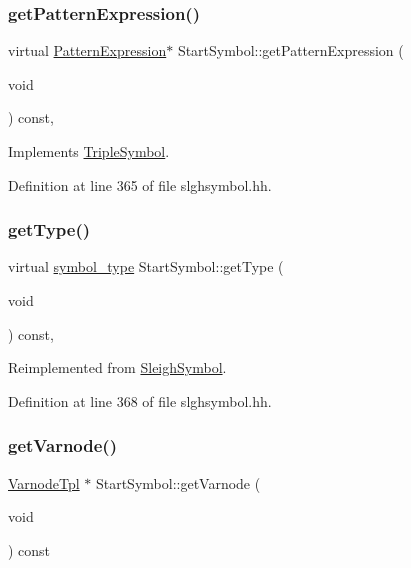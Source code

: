 \subsubsection{\texorpdfstring{getPatternExpression()}{getPatternExpression()}}
{\footnotesize\ttfamily virtual \mbox{\hyperlink{class_pattern_expression}{Pattern\+Expression}}$\ast$ Start\+Symbol\+::get\+Pattern\+Expression (\begin{DoxyParamCaption}\item[{void}]{ }\end{DoxyParamCaption}) const\hspace{0.3cm}{\ttfamily [inline]}, {\ttfamily [virtual]}}



Implements \mbox{\hyperlink{class_triple_symbol_a213895658c5fe547edf9ac54a1d2de2e}{Triple\+Symbol}}.



Definition at line 365 of file slghsymbol.\+hh.

\mbox{\label{class_start_symbol_a6c672bdde679f497bc852befabc297bd}} 
\subsubsection{\texorpdfstring{getType()}{getType()}}
{\footnotesize\ttfamily virtual \mbox{\hyperlink{class_sleigh_symbol_aba70f7f332fd63488c5ec4bd7807db41}{symbol\+\_\+type}} Start\+Symbol\+::get\+Type (\begin{DoxyParamCaption}\item[{void}]{ }\end{DoxyParamCaption}) const\hspace{0.3cm}{\ttfamily [inline]}, {\ttfamily [virtual]}}



Reimplemented from \mbox{\hyperlink{class_sleigh_symbol_a2f6e5903e461084c29f95ea024883950}{Sleigh\+Symbol}}.



Definition at line 368 of file slghsymbol.\+hh.

\mbox{\label{class_start_symbol_a1f8a44a3f3f69018161563f7dc0a4d74}} 
\subsubsection{\texorpdfstring{getVarnode()}{getVarnode()}}
{\footnotesize\ttfamily \mbox{\hyperlink{class_varnode_tpl}{Varnode\+Tpl}} $\ast$ Start\+Symbol\+::get\+Varnode (\begin{DoxyParamCaption}\item[{void}]{ }\end{DoxyParamCaption}) const\hspace{0.3cm}{\ttfamily [virtual]}}



